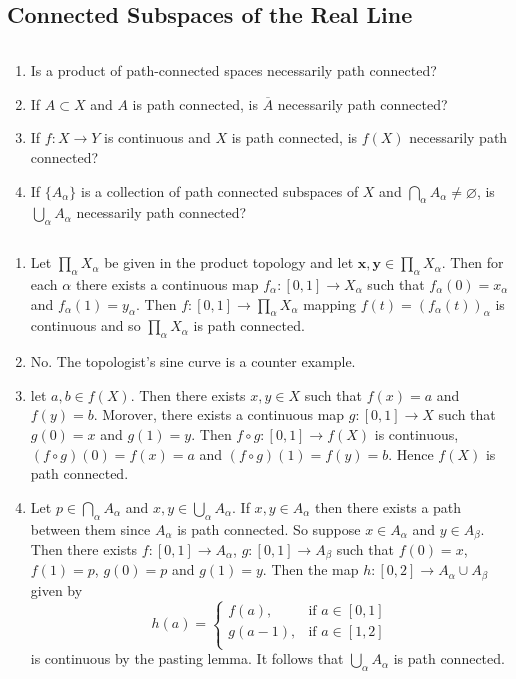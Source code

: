 \subsection{Connected Subspaces of the Real Line}
\begin{ex}{24.1}
    ${}$
    \begin{enumerate}
        \item Is a product of path-connected spaces necessarily path connected?
        \item If $A\subset X$ and $A$ is path connected, is $\overline{A}$ necessarily path connected?
        \item If $f:X\to Y$ is continuous and $X$ is path connected, is $f(X)$ necessarily path connected?
        \item If $\{A_\alpha\}$ is a collection of path connected subspaces of $X$ and $\bigcap_\alpha A_\alpha\neq\varnothing$,
        is $\bigcup_\alpha A_\alpha$ necessarily path connected? 
    \end{enumerate}
\end{ex}

\begin{sol}
    ${}$
    \begin{enumerate}
        \item Let $\prod_\alpha X_\alpha$ be given in the product topology and let $\mathbf{x},\mathbf{y}\in\prod_\alpha X_\alpha$.
            Then for each $\alpha$ there exists a continuous map $f_\alpha:[0,1]\to X_\alpha$ such that $f_\alpha(0)=x_\alpha$ and $f_\alpha(1)=y_\alpha$.
            Then $f:[0,1]\to\prod_\alpha X_\alpha$ mapping $f(t)=(f_\alpha(t))_\alpha$ is continuous and so $\prod_\alpha X_\alpha$ is path connected. 
        \item No. The topologist's sine curve is a counter example. 
        \item let $a,b\in f(X)$. Then there exists $x,y\in X$ such that $f(x)=a$ and $f(y)=b$. Morover, there exists a continuous map $g:[0,1]\to X$ such that $g(0)=x$ and $g(1)=y$.
            Then $f\circ g:[0,1]\to f(X)$ is continuous, $(f\circ g)(0)=f(x)=a$ and $(f\circ g)(1)=f(y)=b$. Hence $f(X)$ is path connected.
        \item Let $p\in\bigcap_\alpha A_\alpha$ and $x,y\in\bigcup_\alpha A_\alpha$. If $x,y\in A_\alpha$ then there exists a path between them since $A_\alpha$ is path connected.
            So suppose $x\in A_\alpha$ and $y\in A_\beta$. Then there exists $f:[0,1]\to A_\alpha$, $g:[0,1]\to A_\beta$ such that $f(0)=x$, $f(1)=p$, $g(0)=p$ and $g(1)=y$. 
            Then the map $h:[0,2]\to A_\alpha\cup A_\beta$ given by
            $$h(a)=\begin{cases}
                f(a),&\text{if } a\in[0, 1]\\
                g(a-1),&\text{if } a\in[1, 2]\\
            \end{cases}$$
            is continuous by the pasting lemma. It follows that $\bigcup_\alpha A_\alpha$ is path connected.

    \end{enumerate}
\end{sol}